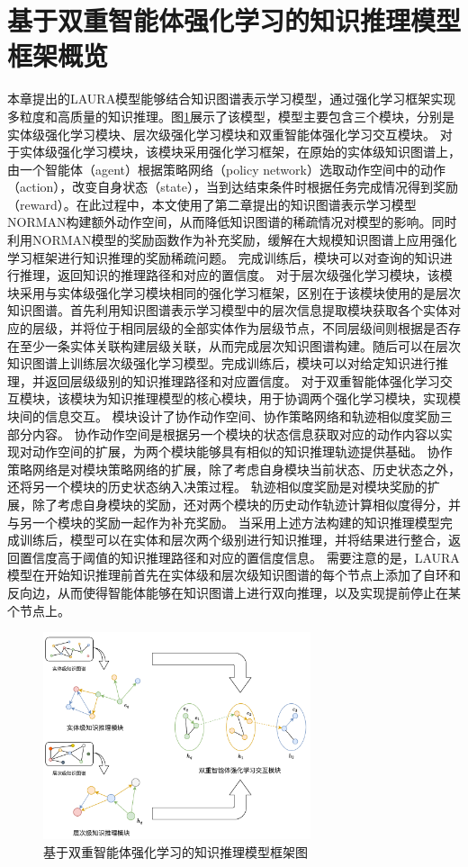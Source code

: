 \documentclass[algorithmlist, AutoFakeBold, AutoFakeSlant, figurelist, tablelist, nomlist, engineering]{seuthesix}
\begin{document}
\section{基于双重智能体强化学习的知识推理模型框架概览}
本章提出的LAURA模型能够结合知识图谱表示学习模型，通过强化学习框架实现多粒度和高质量的知识推理。图\ref{3_LAURA}展示了该模型，模型主要包含三个模块，分别是实体级强化学习模块、层次级强化学习模块和双重智能体强化学习交互模块。
对于实体级强化学习模块，该模块采用强化学习框架，在原始的实体级知识图谱上，由一个智能体（agent）根据策略网络（policy network）选取动作空间中的动作（action），改变自身状态（state），当到达结束条件时根据任务完成情况得到奖励（reward）。在此过程中，本文使用了第二章提出的知识图谱表示学习模型NORMAN构建额外动作空间，从而降低知识图谱的稀疏情况对模型的影响。同时利用NORMAN模型的奖励函数作为补充奖励，缓解在大规模知识图谱上应用强化学习框架进行知识推理的奖励稀疏问题。
完成训练后，模块可以对查询的知识进行推理，返回知识的推理路径和对应的置信度。
对于层次级强化学习模块，该模块采用与实体级强化学习模块相同的强化学习框架，区别在于该模块使用的是层次知识图谱。首先利用知识图谱表示学习模型中的层次信息提取模块获取各个实体对应的层级，并将位于相同层级的全部实体作为层级节点，不同层级间则根据是否存在至少一条实体关联构建层级关联，从而完成层次知识图谱构建。随后可以在层次知识图谱上训练层次级强化学习模型。完成训练后，模块可以对给定知识进行推理，并返回层级级别的知识推理路径和对应置信度。
对于双重智能体强化学习交互模块，该模块为知识推理模型的核心模块，用于协调两个强化学习模块，实现模块间的信息交互。
模块设计了协作动作空间、协作策略网络和轨迹相似度奖励三部分内容。
协作动作空间是根据另一个模块的状态信息获取对应的动作内容以实现对动作空间的扩展，为两个模块能够具有相似的知识推理轨迹提供基础。
协作策略网络是对模块策略网络的扩展，除了考虑自身模块当前状态、历史状态之外，还将另一个模块的历史状态纳入决策过程。
轨迹相似度奖励是对模块奖励的扩展，除了考虑自身模块的奖励，还对两个模块的历史动作轨迹计算相似度得分，并与另一个模块的奖励一起作为补充奖励。
当采用上述方法构建的知识推理模型完成训练后，模型可以在实体和层次两个级别进行知识推理，并将结果进行整合，返回置信度高于阈值的知识推理路径和对应的置信度信息。
需要注意的是，LAURA模型在开始知识推理前首先在实体级和层次级知识图谱的每个节点上添加了自环和反向边，从而使得智能体能够在知识图谱上进行双向推理，以及实现提前停止在某个节点上。
\begin{figure}
  \centering
  \includegraphics[width=0.7\textwidth]{3_LAURA}
  \caption{基于双重智能体强化学习的知识推理模型框架图}
  \label{3_LAURA}
\end{figure}
\end{document}
